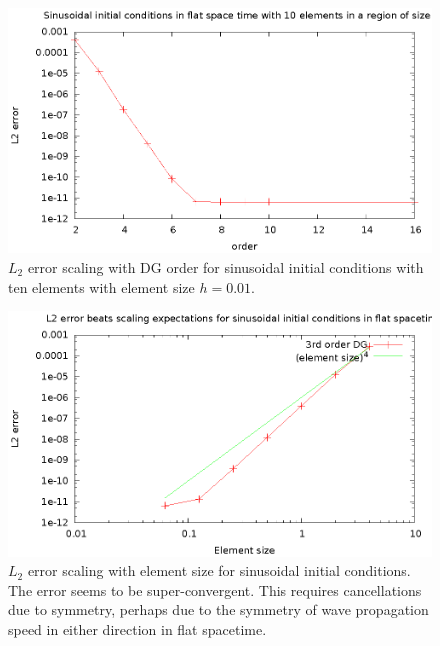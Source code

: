 \begin{figure}
  \includegraphics{sinL2WTorder}
  \caption{$L_2$ error scaling with DG order for sinusoidal initial conditions with ten elements with element size $h=0.01$.}
  \label{scalingorder}
\end{figure}

\begin{figure}
  \includegraphics{sinL2WTelement}
  \caption{$L_2$ error scaling with element size for sinusoidal initial conditions. The error seems to be super-convergent. This requires cancellations due to symmetry, perhaps due to the symmetry of wave propagation speed in either direction in flat spacetime.}
  \label{scalingelement}
\end{figure}


